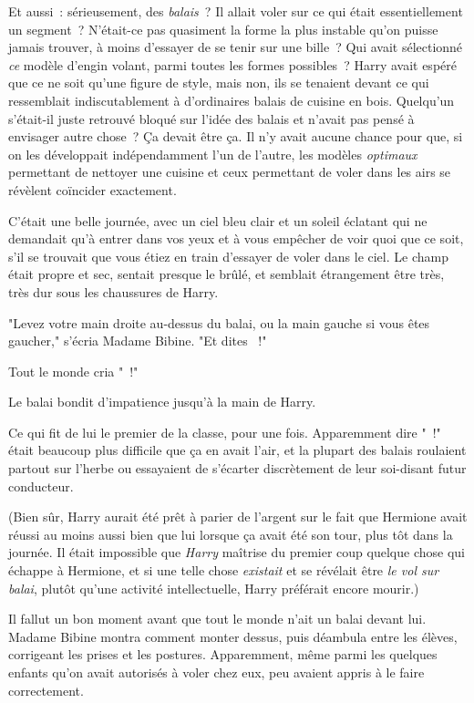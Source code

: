 Et aussi~: sérieusement, des \emph{balais}~? Il allait voler sur ce qui était essentiellement un segment~? N'était-ce pas quasiment la forme la plus instable qu'on puisse jamais trouver, à moins d'essayer de se tenir sur une bille~? Qui avait sélectionné \emph{ce} modèle d'engin volant, parmi toutes les formes possibles~? Harry avait espéré que ce ne soit qu'une figure de style, mais non, ils se tenaient devant ce qui ressemblait indiscutablement à d'ordinaires balais de cuisine en bois. Quelqu'un s'était-il juste retrouvé bloqué sur l'idée des balais et n'avait pas pensé à envisager autre chose~? Ça devait être ça. Il n'y avait aucune chance pour que, si on les développait indépendamment l'un de l'autre, les modèles \emph{optimaux} permettant de nettoyer une cuisine et ceux permettant de voler dans les airs se révèlent coïncider exactement.

C'était une belle journée, avec un ciel bleu clair et un soleil éclatant qui ne demandait qu'à entrer dans vos yeux et à vous empêcher de voir quoi que ce soit, s'il se trouvait que vous étiez en train d'essayer de voler dans le ciel. Le champ était propre et sec, sentait presque le brûlé, et semblait étrangement être très, très dur sous les chaussures de Harry.

"Levez votre main droite au-dessus du balai, ou la main gauche si vous êtes gaucher," s'écria Madame Bibine. "Et dites ~!"

Tout le monde cria "~!"

Le balai bondit d'impatience jusqu'à la main de Harry.

Ce qui fit de lui le premier de la classe, pour une fois. Apparemment dire "~!" était beaucoup plus difficile que ça en avait l'air, et la plupart des balais roulaient partout sur l'herbe ou essayaient de s'écarter discrètement de leur soi-disant futur conducteur.

(Bien sûr, Harry aurait été prêt à parier de l'argent sur le fait que Hermione avait réussi au moins aussi bien que lui lorsque ça avait été son tour, plus tôt dans la journée. Il était impossible que \emph{Harry} maîtrise du premier coup quelque chose qui échappe à Hermione, et si une telle chose \emph{existait} et se révélait être \emph{le vol sur balai}, plutôt qu'une activité intellectuelle, Harry préférait encore mourir.)

Il fallut un bon moment avant que tout le monde n'ait un balai devant lui. Madame Bibine montra comment monter dessus, puis déambula entre les élèves, corrigeant les prises et les postures. Apparemment, même parmi les quelques enfants qu'on avait autorisés à voler chez eux, peu avaient appris à le faire correctement.

